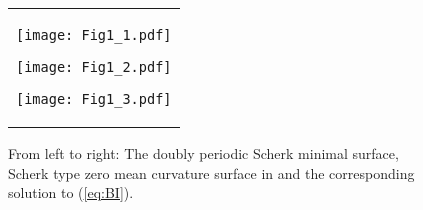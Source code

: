 \documentclass[12pt,amstex]{amsart}%
\theoremstyle{plain} %
\theoremstyle{definition}
\begin{document}
\begin{figure}[!h]
\begin{center}
\begin{tabular}{c}
\hspace{+0.1cm}
\begin{minipage}{0.3\hsize}
\begin{center}
\vspace{-0.3cm}
\texttt{[image: Fig1\_1.pdf]}
\vspace{0.5cm}
\end{center}
\end{minipage}
\hspace{0.0cm}
\begin{minipage}{0.3\hsize}
\begin{center}
\vspace{-1.3cm}
\texttt{[image: Fig1\_2.pdf]}
\vspace{0.3cm}
\end{center}
\end{minipage}

\hspace{-0.1cm}
\begin{minipage}{0.3\hsize}
\begin{center}
\vspace{-0.3cm}
\texttt{[image: Fig1\_3.pdf]}
\vspace{0.5cm}
\end{center}
\end{minipage}

\end{tabular}
\end{center}
\vspace{-0.3cm}
\caption{From left to right: The doubly periodic Scherk minimal surface, Scherk type zero mean curvature surface in \cite{Kobayashi} and the corresponding solution to (\ref{eq:BI}).}\label{Fig1}

\end{figure}
\end{document}
